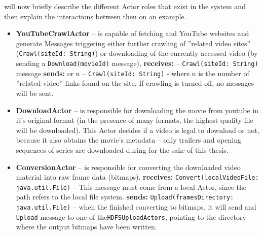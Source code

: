 will now briefly describe the different Actor roles that exist in the system and then explain the interactions between then on an example.

\begin{itemize}
  \item \textbf{YouTubeCrawlActor} -- is capable of fetching and YouTube websites and generate Messages triggering
                                    either further crawling of ''related video sites'' (\verb|Crawl(siteId: String)|) or downloading of the 
                                    currently accessed video (by sending a \verb|Download(movieId)| message),
    \subitem  \textbf{receives:}
       -- \verb|Crawl(siteId: String)| message
    \subitem  \textbf{sends:}
       or n -- \verb|Crawl(siteId: String)| - where n is the number of ''related video'' links found on the site. 
                                                           If crawling is turned off, no messages will be sent.

  \item \textbf{DownloadActor} -- is responsible for downloading the movie from youtube in it's original format (in the presence of many formats, 
                                the highest quality file will be downloaded). This Actor decides if a video is legal to download or not, because it also
                                obtains the movie's metadata -- only trailers and opening sequences of series are downloaded during for the sake of this 
                                thesis.
                                
  \item \textbf{ConversionActor} -- is responsible for converting the downloaded video material into raw frame data (bitmaps).
    \subitem  \textbf{receives:}
      \subsubitem \verb|Convert(localVideoFile: java.util.File)| -- This message must come from a local Actor, since the path refers to the local file system.
    \subitem  \textbf{sends:}
      \subsubitem \verb|Upload(framesDirectory: java.util.File)| -- when the finished converting to bitmaps, it will send and \verb|Upload| message to one of the\verb|HDFSUploadActors|, pointing to the directory where the output bitmaps have been written.
                                                                    

\end{itemize}
